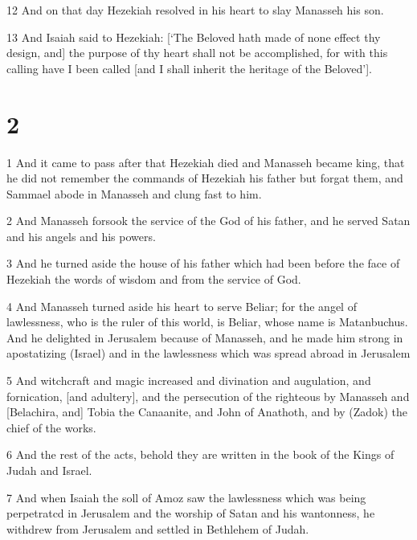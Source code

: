 \par 12 And on that day Hezekiah resolved in his heart to slay Manasseh his son.

\par 13 And Isaiah said to Hezekiah: [‘The Beloved hath made of none effect thy design, and] the purpose of thy heart shall not be accomplished, for with this calling have I been called [and I shall inherit the heritage of the Beloved’].

\chapter{2}

\par 1 And it came to pass after that Hezekiah died and Manasseh became king, that he did not remember the commands of Hezekiah his father but forgat them, and Sammael abode in Manasseh and clung fast to him.

\par 2 And Manasseh forsook the service of the God of his father, and he served Satan and his angels and his powers.

\par 3 And he turned aside the house of his father which had been before the face of Hezekiah the words of wisdom and from the service of God.

\par 4 And Manasseh turned aside his heart to serve Beliar; for the angel of lawlessness, who is the ruler of this world, is Beliar, whose name is Matanbuchus. And he delighted in Jerusalem because of Manasseh, and he made him strong in apostatizing (Israel) and in the lawlessness which was spread abroad in Jerusalem

\par 5 And witchcraft and magic increased and divination and augulation, and fornication, [and adultery], and the persecution of the righteous by Manasseh and [Belachira, and] Tobia the Canaanite, and John of Anathoth, and by (Zadok) the chief of the works.

\par 6 And the rest of the acts, behold they are written in the book of the Kings of Judah and Israel.

\par 7 And when Isaiah the soll of Amoz saw the lawlessness which was being perpetratcd in Jerusalem and the worship of Satan and his wantonness, he withdrew from Jerusalem and settled in Bethlehem of Judah.

